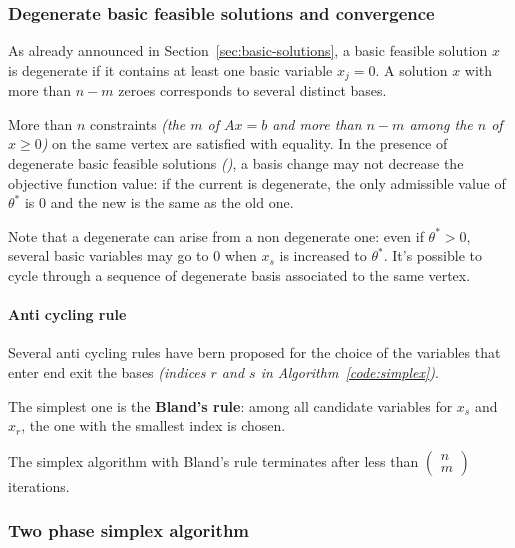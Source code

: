 \documentclass[english]{article}
\begin{document}
\subsubsection{Degenerate basic feasible solutions and convergence}

As already announced in Section~\ref{sec:basic-solutions}, a basic feasible solution \(x\) is degenerate if it contains at least one basic variable \(x_j = 0\).
A solution \(x\) with more than \(n -m\) zeroes corresponds to several distinct bases.

More than \(n\) constraints \textit{(the \(m\) of \(Ax = b\) and more than \(n-m\) among the \(n\) of \(x \geq 0\))} on the same vertex are satisfied with equality.
In the presence of degenerate basic feasible solutions \textit{(\BFS)}, a basis change may not decrease the objective function value:
if the current \BFS is degenerate, the only admissible value of \(\theta^\ast\) is \(0\) and the new \BFS is the same as the old one.

Note that a degenerate \BFS can arise from a non degenerate one:
even if \(\theta^\ast > 0\), several basic variables may go to \(0\) when \(x_s\) is increased to \(\theta^\ast\).
It's possible to cycle through a sequence of degenerate basis associated to the same vertex.

\paragraph{Anti cycling rule}

Several anti cycling rules have bern proposed for the choice of the variables that enter end exit the bases \textit{(indices \(r\) and \(s\) in Algorithm~\ref{code:simplex})}.

The simplest one is the \textbf{Bland's rule}: among all candidate variables for \(x_s\) and \(x_r\), the one with the smallest index is chosen.

\begin{property}
  The simplex algorithm with Bland's rule terminates after less than \(\begin{pmatrix}
    n \\ m
  \end{pmatrix}\) iterations.
\end{property}

\subsubsection{Two phase simplex algorithm}
\end{document}
